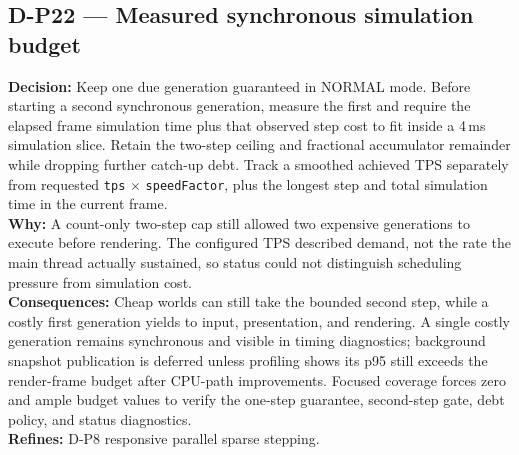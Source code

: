 \subsection*{D-P22 --- Measured synchronous simulation budget}
\begin{decisionbox}[title={D-P22 \quad 2026-08-09}]
\textbf{Decision:} Keep one due generation guaranteed in NORMAL mode. Before
starting a second synchronous generation, measure the first and require the
elapsed frame simulation time plus that observed step cost to fit inside a
4\,ms simulation slice. Retain the two-step ceiling and fractional accumulator
remainder while dropping further catch-up debt. Track a smoothed achieved TPS
separately from requested \texttt{tps} $\times$ \texttt{speedFactor}, plus the
longest step and total simulation time in the current frame.\\
\textbf{Why:} A count-only two-step cap still allowed two expensive generations
to execute before rendering. The configured TPS described demand, not the rate
the main thread actually sustained, so status could not distinguish scheduling
pressure from simulation cost.\\
\textbf{Consequences:} Cheap worlds can still take the bounded second step,
while a costly first generation yields to input, presentation, and rendering.
A single costly generation remains synchronous and visible in timing
diagnostics; background snapshot publication is deferred unless profiling shows
its p95 still exceeds the render-frame budget after CPU-path improvements.
Focused coverage forces zero and ample budget values to verify the one-step
guarantee, second-step gate, debt policy, and status diagnostics.\\
\textbf{Refines:} D-P8 responsive parallel sparse stepping.
\end{decisionbox}

